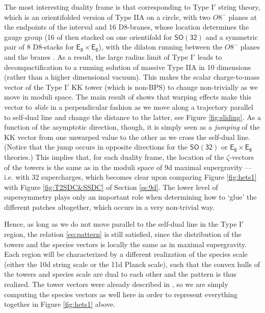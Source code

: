 The most interesting duality frame is that corresponding to Type I$'$ string theory, which is an orientifolded version of Type IIA on a circle, with two $O8^-$ planes at the endpoints of the interval and 16 D8-branes, whose location determines the gauge group (16 of then stacked on one orientifold for $\mathsf{SO(32)}$ and a symmetric pair of 8 D8-stacks for $\mathsf{E_8\times E_8}$), with the dilaton running between the $O8^-$ planes and the branes \cite{Polchinski:1995df}. As a result, %
the large radius limit of Type I$'$ leads to decompactification to a running solution of massive Type IIA in 10 dimensions (rather than a higher dimensional vacuum). This makes the scalar charge-to-mass vector of the Type I$'$ KK tower (which is non-BPS) to change non-trivially as we move in moduli space. The main result of \cite{Etheredge:2023odp} shows that warping effects make this vector to \emph{slide} in a perpendicular fashion as we move along a trajectory parallel to self-dual line and change the distance to the latter, see Figure \ref{fig:sliding}. As a function of the asymptotic direction, though, it is simply seen as a \emph{jumping} of the KK vector from one unwarped value to the other as we cross the self-dual line. (Notice that the jump occurs in opposite directions for the $\mathsf{SO(32)}$ or $\mathsf{E_8\times E_8}$ theories.) This implies that, for each duality frame, the location of the $\zeta$-vectors of the towers is the same as in the moduli space of 9d maximal supergravity --- i.e. with 32 supercharges, which becomes clear upon comparing Figure \ref{fig:hets1} with Figure \ref{fig:T2SDC&SSDC} of Section \ref{ss:9d}. The lower level of supersymmetry plays only an important role when determining how to `glue' the different patches altogether, which occurs in a very non-trivial way.
	
Hence, as long as we do not move parallel to the self-dual line in the Type I$'$ region, the relation \eqref{eq:pattern} is still satisfied, since the distribution of the towers and the species vectors is locally the same as in maximal supergravity. Each region will be characterized by a different realization of the species scale (either the 10d string scale or the 11d Planck scale), such that the convex hulls of the towers and species scale are dual to each other and the pattern is thus realized. The tower vectors were already described in \cite{Etheredge:2023odp}, so we are simply computing the species vectors as well here in order to represent everything together in Figure \ref{fig:hets1} above.
	
